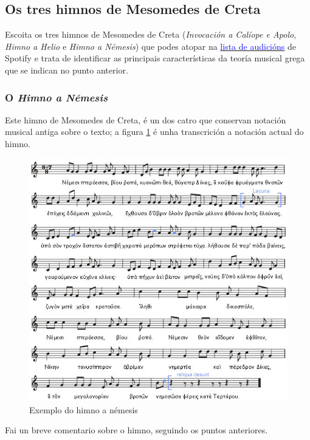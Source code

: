 \subsection*{Os tres himnos de Mesomedes de Creta}
%
Escoita os tres himnos de Mesomedes de Creta (\textit{Invocación a Calíope e Apolo}, \textit{Himno a Helio} e \textit{Himno a Némesis}) que podes atopar na {\href{https://open.spotify.com/playlist/19fWZwUGX6rDo0bejNcWGE?si=1c00d5ff65b24678}{\textcolor{blue}{lista de audicións}}} de Spotify e trata de identificar as principais características da teoría musical grega que se indican no punto anterior.
\par
%
\subsubsection*{O \textit{Himno a Némesis}}
%
Este himno de Mesomedes de Creta, é un dos catro que conservan notación musical antiga sobre o texto; a figura \ref{nemesis-himno} é unha transcrición a notación actual do himno.
%
\begin{figure}[htp]
    \centering
	\includegraphics[scale=0.80]{images/mes-hnem.jpg}
	\caption{Exemplo do himno a némesis}
	\label{nemesis-himno}
	\end{figure}
%
\begin{ejercicio}
Fai un breve comentario sobre o himno, seguindo os puntos anteriores.
        \vspace*{3.3cm}
\end{ejercicio}
 
